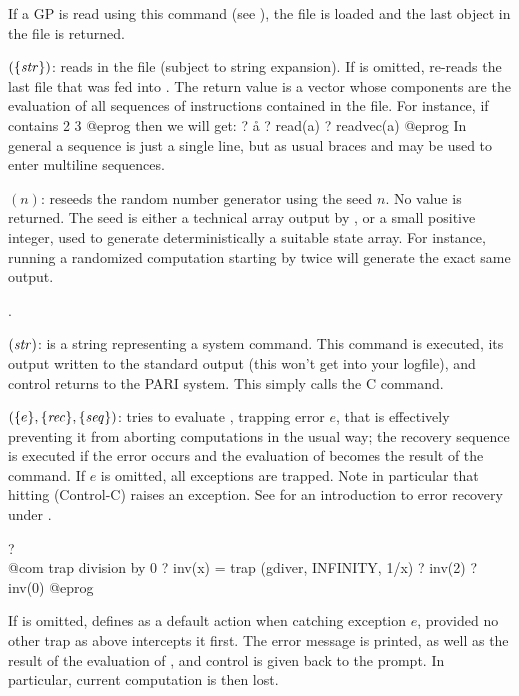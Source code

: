 If a GP  is read using this command (see
), the file is loaded and the last object in the file
is returned.

$(\{\hbox{\it str\/}\})$:  reads in the file
 (subject to string expansion). If  is
omitted, re-reads the last file that was fed into . The return
value is a vector whose components are the evaluation of all sequences
of instructions contained in the file. For instance, if  contains
  2
  3
@eprog\noindent
then we will get:
\bprog
  ? \r a
  ? read(a)
  ? readvec(a)
@eprog
In general a sequence is just a single line, but as usual braces and
\kbd{\bs\bs} may be used to enter multiline sequences.

$(n)$: reseeds the random number generator using the
seed $n$. No value is returned. The seed is either a technical array output
by , or a small positive integer, used to generate
deterministically a suitable state array. For instance, running a randomized
computation starting by  twice will generate the exact same
output.

.

$(\hbox{\it str\/})$:  is a string representing
a system command. This command is executed, its output written to the
standard output (this won't get into your logfile), and control returns
to the PARI system. This simply calls the C  command.

$(\{e\}, \{\hbox{\it rec\/}\}, \{\hbox{\it seq\/}\})$: tries to
evaluate , trapping error $e$, that is effectively preventing it
from aborting computations in the usual way; the recovery sequence
 is executed if the error occurs and the evaluation of 
becomes the result of the command. If $e$ is omitted, all exceptions are
trapped. Note in particular that hitting  (Control-C) raises an
exception. See  for an introduction to error recovery
under .

\bprog
? \\@com trap division by 0
? inv(x) = trap (gdiver, INFINITY, 1/x)
? inv(2)
? inv(0)
@eprog

If  is omitted, defines  as a default action when
catching exception $e$, provided no other trap as above intercepts it first.
The error message is printed, as well as the result of the evaluation of
, and control is given back to the  prompt. In particular, current
computation is then lost.

